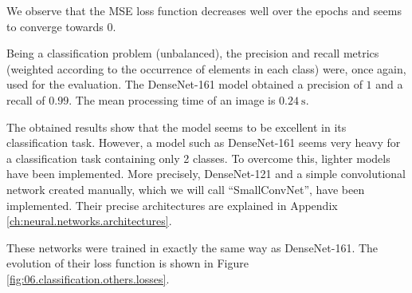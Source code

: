 We observe that the MSE loss function decreases well over the epochs and seems to converge towards $0$.

Being a classification problem (unbalanced), the precision and recall metrics (weighted according to the occurrence of elements in each class) were, once again, used for the evaluation. The DenseNet-161 model obtained a precision of $\num{1}$ and a recall of $\num{0.99}$. The mean processing time of an image is $\SI{0.24}{\second}$.

The obtained results show that the model seems to be excellent in its classification task. However, a model such as DenseNet-161 seems very heavy for a classification task containing only 2 classes. To overcome this, lighter models have been implemented. More precisely, DenseNet-121 and a simple convolutional network created manually, which we will call \enquote{SmallConvNet}, have been implemented. Their precise architectures are explained in Appendix \ref{ch:neural.networks.architectures}.

These networks were trained in exactly the same way as DenseNet-161. The evolution of their loss function is shown in Figure \ref{fig:06.classification.others.losses}.

